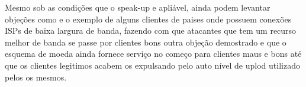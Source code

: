 \documentclass[a4paper,12pt]{article}
\begin{document}
 \vspace{0.5cm}
 
 
 Mesmo sob as condições que o speak-up e apliável, ainda podem levantar objeções como e o exemplo de alguns clientes de paises onde possuem conexões ISPs de baixa largura de banda, fazendo com que atacantes que tem um recurso melhor de banda se passe por clientes bons outra objeção demostrado e que o esquema de moeda ainda fornece serviço no começo para clientes maus e bons até que os clientes legitimos acabem os expulsando pelo auto nível de uplod utilizado pelos os mesmos.
 
 
 
\vspace{4cm}


\begin{center}
\end{center}

 
\end{document}
